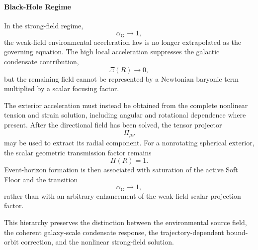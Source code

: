 \paragraph{Black-Hole Regime}
In the strong-field regime,
\begin{equation}
    \alpha_{\mathrm{G}} \rightarrow 1,
\end{equation}
the weak-field environmental acceleration law is no longer extrapolated as the governing equation. The high local acceleration suppresses the galactic condensate contribution,
\begin{equation}
    \Xi(R) \rightarrow 0,
\end{equation}
but the remaining field cannot be represented by a Newtonian baryonic term multiplied by a scalar focusing factor.

The exterior acceleration must instead be obtained from the complete nonlinear tension and strain solution, including angular and rotational dependence where present. After the directional field has been solved, the tensor projector
\begin{equation}
    \Pi_{\mu\nu}
\end{equation}
may be used to extract its radial component. For a nonrotating spherical exterior, the scalar geometric transmission factor remains
\begin{equation}
    \Pi(R) = 1.
\end{equation}
Event-horizon formation is then associated with saturation of the active Soft Floor and the transition
\begin{equation}
    \alpha_{\mathrm{G}} \rightarrow 1,
\end{equation}
rather than with an arbitrary enhancement of the weak-field scalar projection factor.

This hierarchy preserves the distinction between the environmental source field, the coherent galaxy-scale condensate response, the trajectory-dependent bound-orbit correction, and the nonlinear strong-field solution.
